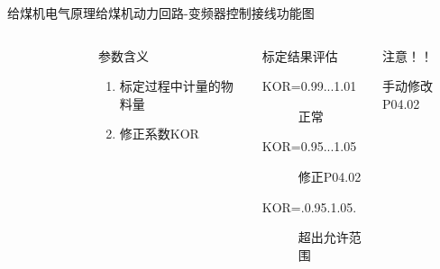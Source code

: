 \documentclass[12pt,hyperref={CJKbookmarks=true}]{beamer} %
\begin{document}
\begin{frame}{给煤机电气原理}{给煤机动力回路-变频器控制接线功能图}
  		\begin{columns}
\begin{figure}
	
\end{figure}
\begin{block}{参数含义}
			\begin{enumerate}
				\item 标定过程中计量的物料量
				\item  修正系数KOR
				\end{enumerate}
\end{block}
\begin{exampleblock}{标定结果评估}
			\begin{description}
				\item[KOR=0.99...1.01]正常
				\item[KOR=0.95...1.05]修正P04.02
				\item[KOR=.0.95.1.05.]超出允许范围
				\end{description}
\end{exampleblock}
\begin{alertblock}{注意！！}
			
				手动修改P04.02
\end{alertblock}
		\end{columns}
	\end{frame}
\end{document}
